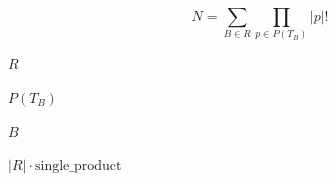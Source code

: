 \documentclass{article}
\begin{document}
\[    N = \sum_{B \in R} \prod_{p \in P(T_B)} |p|!
\]
\pagebreak

$R$
\pagebreak

$P(T_B)$
\pagebreak

$B$
\pagebreak

$|R| \cdot \text{single\_product}$
\pagebreak
\end{document}
